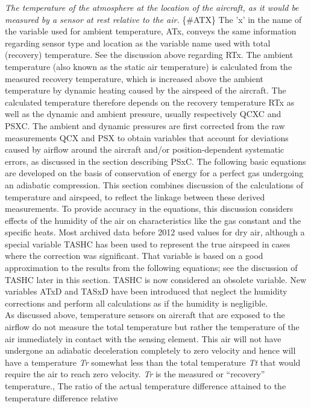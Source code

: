 \documentclass[
  english,
]{book}
\begin{document}
\emph{The temperature of the atmosphere at the location of the aircraft,
as it would be measured by a sensor at rest relative to the air.}
\{\#ATX\} The 'x' in the name of the variable used for ambient
temperature, ATx, conveys the same information regarding sensor type and
location as the variable name used with total (recovery) temperature.
See the discussion above regarding RTx. The ambient temperature (also
known as the static air temperature) is calculated from the measured
recovery temperature, which is increased above the ambient temperature
by dynamic heating caused by the airspeed of the aircraft. The
calculated temperature therefore depends on the recovery temperature RTx
as well as the dynamic and ambient pressure, usually respectively QCXC
and PSXC. The ambient and dynamic pressures are first corrected from the
raw measurements QCX and PSX to obtain variables that account for
deviations caused by airflow around the aircraft and/or
position-dependent systematic errors, as discussed in the section
describing PSxC. The following basic equations are developed on the
basis of conservation of energy for a perfect gas undergoing an
adiabatic compression. This section combines discussion of the
calculations of temperature and airspeed, to reflect the linkage between
these derived measurements. To provide accuracy in the equations, this
discussion considers effects of the humidity of the air on
characteristics like the gas constant and the specific heats. Most
archived data before 2012 used values for dry air, although a special
variable TASHC has been used to represent the true airspeed in cases
where the correction was significant. That variable is based on a good
approximation to the results from the following equations; see the
discussion of TASHC later in this section. TASHC is now considered an
obsolete variable. New variables ATxD and TASxD have been introduced
that neglect the humidity corrections and perform all calculations as if
the humidity is negligible. \\
As discussed above, temperature sensors on aircraft that are exposed to
the airflow do not measure the total temperature but rather the
temperature of the air immediately in contact with the sensing element.
This air will not have undergone an adiabatic deceleration completely to
zero velocity and hence will have a temperature {\emph{T}\emph{r}}
somewhat less than the total temperature {\emph{T}\emph{t}} that would
require the air to reach zero velocity. {\emph{T}\emph{r}} is the
measured or ``recovery'' temperature., The ratio of the actual
temperature difference attained to the temperature difference relative
\end{document}
